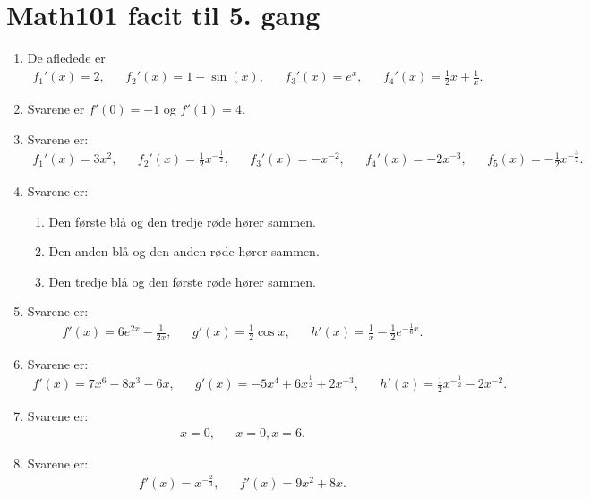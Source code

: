 \newpage
\section{Math101 facit til 5. gang}
\begin{enumerate}
	\item De afledede er
	\begin{align*}
	f_1'(x)=2,&& f_2'(x)=1-\sin(x),&& f_3'(x)=e^x,&&f_4'(x)=\frac{1}{2}x+\frac{1}{x}.
	\end{align*}
	
	
	\item Svarene er $f'(0)=-1$ og $f'(1)=4$.

	\item Svarene er:
	\begin{align*}
	f_1'(x)=3x^2,&& f_2'(x)=\frac{1}{2}x^{-\frac{1}{2}},&& f_3'(x)=-x^{-2},&&f_4'(x)=-2x^{-3},&&f_5(x)=-\frac{1}{2}x^{-\frac{3}{2}}.
	\end{align*}
	\item  Svarene er:
\begin{enumerate}
	\item Den første blå og den tredje røde hører sammen.
	\item Den anden blå og den anden røde hører sammen.
	\item Den tredje blå og den første røde hører sammen.
	\end{enumerate}
	
	\item Svarene er:
	\begin{align*}
	f'(x)=6e^{2x}-\frac{1}{2x},&& g'(x)=\frac{1}{2}\cos x,&& h'(x)=\frac{1}{x}-\frac{1}{2}e^{-\frac{1}{6}x}.
	\end{align*}
	
	\item Svarene er:
	\begin{align*}
	f'(x)=7x^6-8x^3-6x,&&g'(x)=-5x^4+6x^{\frac{1}{2}}+2x^{-3},&&h'(x)=\frac{1}{2}x^{-\frac{1}{2}}-2x^{-2}.
	\end{align*}
	
	
	\item Svarene er:
	\begin{align*}
	x=0,&& x=0,x=6. 
	\end{align*}
	
	\item Svarene er:
	\begin{align*}
	f'(x)=x^{-\frac{2}{3}},&& f'(x)=9x^2+8x.
	\end{align*}
		


\end{enumerate}
